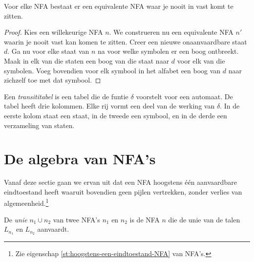 \documentclass[main.tex]{subfiles}
\begin{document}
\begin{st}
  Voor elke NFA bestaat er een equivalente NFA waar je nooit in vast komt te zitten.

  \begin{proof}
    Kies een willekeurige NFA $n$.
    We construeren nu een equivalente NFA $n'$ waarin je nooit vast kan komen te zitten.
    Creer een nieuwe onaanvaardbare staat $d$. Ga nu voor elke staat van $n$ na voor welke symbolen er een boog ontbreekt.
    Maak in elk van die staten een boog van die staat naar $d$ voor elk van die symbolen.
    Voeg bovendien voor elk symbool in het alfabet een boog van $d$ naar zichzelf toe met dat symbool.
  \end{proof}
\end{st}

\begin{de}
  Een \emph{transititabel} is een tabel die de funtie $\delta$ voorstelt voor een automaat.
  De tabel heeft drie kolommen. Elke rij vormt een deel van de werking van $\delta$.
  In de eerste kolom staat een staat, in de tweede een symbool, en in de derde een verzameling van staten.                   
\end{de}

\section{De algebra van NFA's}
Vanaf deze sectie gaan we ervan uit dat een NFA hoogstens \'e\'en aanvaardbare eindtoestand heeft waaruit bovendien geen pijlen vertrekken, zonder verlies van algemeenheid.\footnote{Zie eigenschap \ref{st:hoogstens-een-eindtoestand-NFA} van NFA's.}
\label{sec:de-algebra-van-nfas}

\begin{de}
  De \emph{unie} $n_{1} \cup n_{2}$ van twee NFA's $n_{1}$ en $n_{2}$ is de NFA $n$ die de unie van de talen $L_{n_{1}}$ en $L_{n_{2}}$ aanvaardt.
\end{de}
\end{document}
